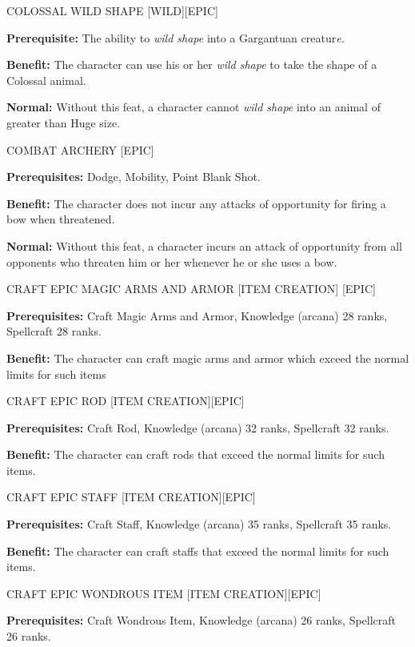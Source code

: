\documentclass{article}
\begin{document}
\vspace{12pt}
COLOSSAL WILD SHAPE [WILD][EPIC] 

\textbf{Prerequisite:} The ability to \textit{wild shape }into a Gargantuan creatur\textit{e.}

\textbf{Benefit:} The character can use his or her \textit{wild shape }to take 
the shape of a Colossal animal. 

\textbf{Normal:} Without this feat, a character cannot \textit{wild shape }into 
an animal of greater than Huge size. 

\vspace{12pt}
COMBAT ARCHERY [EPIC] 

\textbf{Prerequisites:} Dodge, Mobility, Point Blank Shot. 

\textbf{Benefit:} The character does not incur any attacks of opportunity for firing 
a bow when threatened. 

\textbf{Normal:} Without this feat, a character incurs an attack of opportunity 
from all opponents who threaten him or her whenever he or she uses a bow. 

\vspace{12pt}
CRAFT EPIC MAGIC ARMS AND ARMOR [ITEM CREATION] [EPIC] 

\textbf{Prerequisites:} Craft Magic Arms and Armor, Knowledge (arcana) 28 ranks, 
Spellcraft 28 ranks. 

\textbf{Benefit:} The character can craft magic arms and armor which exceed the 
normal limits for such items

\vspace{12pt}
CRAFT EPIC ROD [ITEM CREATION][EPIC] 

\textbf{Prerequisites:} Craft Rod, Knowledge (arcana) 32 ranks, Spellcraft 32 ranks. 

\textbf{Benefit:} The character can craft rods that exceed the normal limits for 
such items. 

\vspace{12pt}
CRAFT EPIC STAFF [ITEM CREATION][EPIC] 

\textbf{Prerequisites:} Craft Staff, Knowledge (arcana) 35 ranks, Spellcraft 35 
ranks. 

\textbf{Benefit:} The character can craft staffs that exceed the normal limits 
for such items. 

\vspace{12pt}
CRAFT EPIC WONDROUS ITEM [ITEM CREATION][EPIC] 

\textbf{Prerequisites:} Craft Wondrous Item, Knowledge (arcana) 26 ranks, Spellcraft 
26 ranks. 
\end{document}
